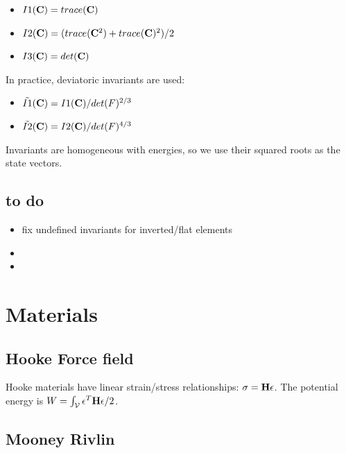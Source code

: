 \begin{itemize}
 \item $I1(\mathbf{{C}}) = trace(\mathbf{{C}})$
 \item $I2(\mathbf{{C}}) = ( trace(\mathbf{{C}}^2)+trace(\mathbf{{C}})^2 )/2$
 \item $I3(\mathbf{{C}}) = det(\mathbf{{C}})$
\end{itemize}

In practice, deviatoric invariants are used:
\begin{itemize}
 \item $\tilde{I1}(\mathbf{{C}}) = I1(\mathbf{{C}})/det(F)^{2/3}$
 \item $\tilde{I2}(\mathbf{{C}}) = I2(\mathbf{{C}})/det(F)^{4/3}$
\end{itemize}

Invariants are homogeneous with energies, so we use their squared roots as the state vectors.

\subsection{to do}

\begin{itemize}
 \item fix undefined invariants for inverted/flat elements
 \item 
 \item 
\end{itemize}







\section{Materials} \label{sec materials}

\subsection{Hooke Force field}

Hooke materials have linear strain/stress relationships: $\sigma=\mathbf{{H}}\epsilon$. 
The potential energy is $W= \int_{\mathcal{V}} \epsilon^T\mathbf{{H}}\epsilon /2$. 

\subsection{Mooney Rivlin}

